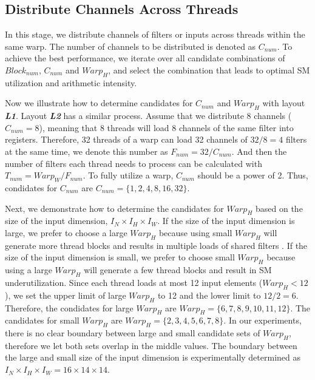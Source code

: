 \subsection{Distribute Channels Across Threads}
In this stage, we distribute channels of filters or inputs across threads within the same warp.
The number of channels to be distributed is denoted as $C_{num}$.
To achieve the best performance, we iterate over all candidate combinations of $Block_{num}$, $C_{num}$ and $Warp_H$, and select the combination that leads to optimal SM utilization and arithmetic intensity.

Now we illustrate how to determine candidates for $C_{num}$ and $Warp_H$ with layout \textbf{\emph{L1}}. 
Layout \textbf{\emph{L2}} has a similar process.
Assume that we distribute 8 channels ($C_{num}=8$), meaning that 8 threads will load 8 channels of the same filter into registers. 
Therefore, 32 threads of a warp can load 32 channels of $32/8=4$ filters at the same time, we denote this number as $F_{num}=32/C_{num}$.
And then the number of filters each thread needs to process can be calculated with $T_{num}=Warp_W/F_{num}$.
To fully utilize a warp, $C_{num}$ should be a power of 2.
Thus, condidates for $C_{num}$ are $C_{num}=\{1,2,4,8,16,32\}$.

Next, we demonstrate how to determine the candidates for $Warp_H$ based on the size of the input dimension, $I_N \times I_H \times I_W$.
If the size of the input dimension is large, we prefer to choose a large $Warp_H$ because using small $Warp_H$ will generate more thread blocks and results in multiple loads of shared filters \cite{jia2020enabling, zheng2020flextensor}.
If the size of the input dimension is small, we prefer to choose small $Warp_H$ because using a large $Warp_H$ will generate a few thread blocks and result in SM underutilization.
Since each thread loads at most 12 input elements ($Warp_H<12$), we set the upper limit of large $Warp_H$ to 12 and the lower limit to $12/2=6$. 
Therefore, the condidates for large $Warp_H$ are $Warp_H=\{6,7,8,9,10,11,12\}$.
The candidates for small $Warp_H$ are $Warp_H=\{2,3,4,5,6,7,8\}$.
In our experiments, there is no clear boundary between large and small candidate sets of $Warp_H$, therefore we let both sets overlap in the middle values.
The boundary between the large and small size of the input dimension is experimentally determined as $I_N \times I_H \times I_W=16 \times 14 \times 14$.

